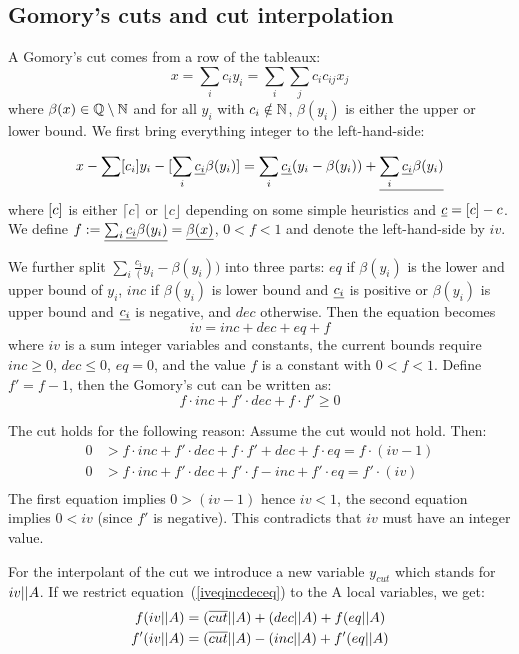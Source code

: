 \documentclass[a4paper]{article}
\begin{document}
\subsection{Gomory's cuts and cut interpolation}

A Gomory's cut comes from a row of the tableaux:
\[ x = \sum_i c_i y_i = \sum_i \sum_j c_i{c_{ij}}x_j \]
where $\beta(x) \in\rational\setminus\nat$ and for all $y_i$ with
$c_i\notin\nat$, $\beta(y_i)$ is either the upper or lower bound. 
We first bring everything integer to the left-hand-side:

\[ x - \sum \round{c_i} y_i - \round{\sum_i \frac{c_i}\beta(y_i)}= 
   \sum_i \frac{c_i} (y_i - \beta(y_i))  + \frac{\sum_i \frac{c_i}\beta(y_i)}\]
where $\round{c}$ is either $\lceil
c\rceil$ or $\lfloor c\rfloor$ depending on some simple heuristics and
$\frac{c} = \round{c} - c$.
We define $f := \frac{\sum_i \frac{c_i}\beta(y_i)} = \frac{\beta(x)}$, $0 < f
< 1$ and denote the left-hand-side by $iv$.

We further split $\sum_i \frac{c_i} (y_i - \beta(y_i))$ into three parts: $eq$
if $\beta(y_i)$ is the lower and upper bound of $y_i$, $inc$ if $\beta(y_i)$
is lower bound and $\frac{c_i}$ is positive or $\beta(y_i)$ is upper bound and
$\frac{c_i}$ is negative, and $dec$ otherwise.  Then the equation becomes
\begin{equation}\label{iveqincdeceq}
   iv = inc + dec + eq + f
\end{equation}
where $iv$ is a sum integer variables and constants, the current bounds
require $inc \geq 0$, $dec \leq 0$, $eq=0$, and the value $f$ is a constant
with $0< f < 1$.  Define $f' = f-1$, then the Gomory's cut can be written as:
\[ f\cdot inc + f' \cdot dec + f\cdot f' \geq 0 \]

The cut holds for the following reason:  Assume the cut would not hold.  Then:
\begin{align*}
 0 &> f\cdot inc + f'\cdot dec + f\cdot f' + dec + f\cdot eq
   =    f\cdot(iv - 1) \\
 0 &> f\cdot inc + f'\cdot dec + f'\cdot f - inc + f'\cdot eq
   =   f'\cdot(iv) \\
\end{align*}
The first equation implies $0 > (iv-1)$ hence $iv < 1$, the second equation
implies $0 < iv$ (since $f'$ is negative).  This contradicts that $iv$ must
have an integer value.

For the interpolant of the cut we introduce a new variable $y_{cut}$ which
stands for $iv\rrestrictA$.  If we restrict equation~(\ref{iveqincdeceq}) to
the A local variables, we get:
\begin{eqnarray*}
  f  (iv\rrestrictA) &= (\negc{cut}\rrestrictA) + (dec\rrestrictA) + f(eq\rrestrictA)\\
  f' (iv\rrestrictA) &= (\negc{cut}\rrestrictA) - (inc\rrestrictA) + f'(eq\rrestrictA)
\end{eqnarray*}
\end{document}
